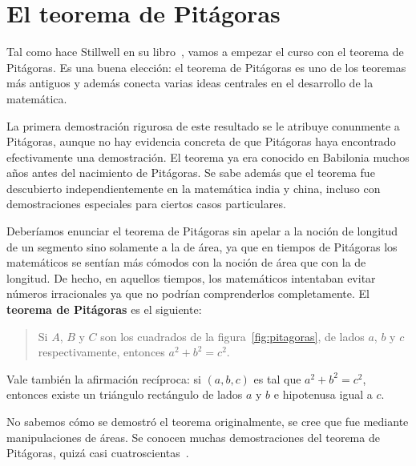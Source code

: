 \chapter{El teorema de Pitágoras}

Tal como hace Stillwell en su libro~\cite{MR2667826}, vamos a empezar el curso
con el teorema de Pitágoras. Es una buena elección: el teorema de Pitágoras es
uno de los teoremas más antiguos y además conecta varias ideas centrales en el
desarrollo de la matemática. 

La primera demostración rigurosa de este resultado se le atribuye conunmente a
Pitágoras, aunque no hay evidencia concreta de que Pitágoras haya encontrado
efectivamente una demostración.  El teorema ya era conocido en Babilonia muchos años 
antes del nacimiento de Pitágoras. Se sabe además que el teorema fue
descubierto independientemente en la matemática india y china, incluso
con demostraciones especiales para ciertos casos particulares. 

Deberíamos enunciar el teorema de Pitágoras sin apelar a la noción de longitud
de un segmento sino solamente a la de área, ya que en tiempos de Pitágoras los
matemáticos se sentían más cómodos con la noción de área que con la de
longitud.  De hecho, en aquellos tiempos, los matemáticos intentaban evitar
números irracionales ya que no podrían comprenderlos completamente. 
El \textbf{teorema de Pitágoras} es el siguiente:

\begin{quote}
Si $A$, $B$ y $C$ son los cuadrados de la figura~\ref{fig:pitagoras}, de
lados $a$, $b$ y $c$ respectivamente, entonces
$a^2+b^2=c^2$.
\end{quote}

Vale también la afirmación recíproca: si $(a,b,c)$ es tal que $a^2+b^2=c^2$,
entonces existe un triángulo rectángulo de lados $a$ y $b$ e hipotenusa igual a
$c$. 

No sabemos cómo se demostró el teorema originalmente, se cree que fue mediante
manipulaciones de áreas. Se conocen muchas demostraciones del teorema de
Pitágoras, quizá casi cuatroscientas~\cite{loomis1968pythagorean}. 

